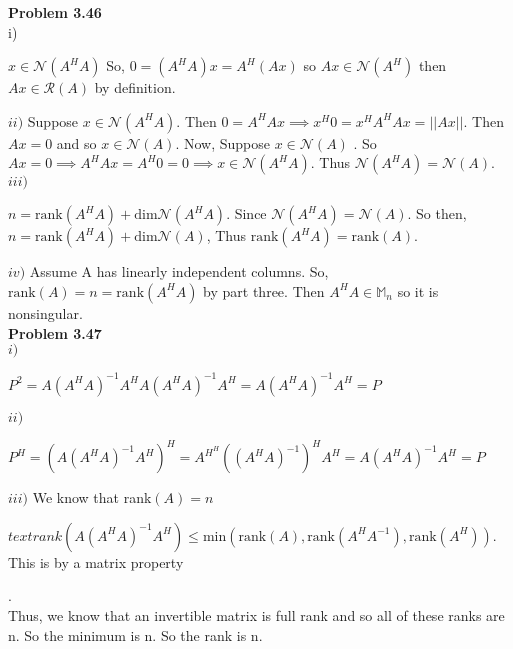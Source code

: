 \documentclass[letterpaper,12pt]{article}
\theoremstyle{definition}
\begin{document}
\vspace{5mm}
 \noindent\textbf{Problem 3.46}\\
 i) \begin{center} $x \in \mathcal{N}(A^HA)$ So, $0 = (A^HA)x = A^H(Ax)$ so  $Ax \in \mathcal{N}(A^H)$ then $Ax \in \mathcal{R}(A)$ by definition.  \end{center}
 $ii)$  Suppose $x \in \mathcal{N}(A^HA)$.  Then $0 = A^HAx \implies x^H0 = x^HA^HAx = ||Ax||$.  Then $Ax= 0$ and so $x \in \mathcal{N}(A)$.  Now, Suppose $x \in \mathcal{N}(A)$ .  So $Ax = 0 \implies A^HAx = A^H0 = 0 \implies x \in \mathcal{N}(A^HA)$.  Thus $\mathcal{N}(A^HA) = \mathcal{N}(A).$\\
 $iii)$ \begin{center} $n = \text{rank}(A^HA) + \text{dim}\mathcal{N}(A^HA)$.  Since $\mathcal{N}(A^HA) = \mathcal{N}(A)$.  So then, $n = \text{rank}(A^HA) + \text{dim}\mathcal{N}(A)$, Thus $\text{rank}(A^HA) = \text{rank}(A)$. \end{center} 
 $iv)$ Assume A has linearly independent columns.  So, $\text{rank}(A) = n = \text{rank}(A^HA)$ by part three.  Then $A^HA \in \mathbb{M}_n$ so it is nonsingular.\\
 
 
 \vspace{5mm}
 \noindent\textbf{Problem 3.47}\\
 $i)$ \begin{center} $P^2 = A(A^HA)^{-1}A^HA(A^HA)^{-1}A^H = A(A^HA)^{-1}A^H = P$ \end{center}
 $ii)$ \begin{center} $P^H = (A(A^HA)^{-1}A^H)^H = A^{H^H}((A^HA)^{-1})^HA^H = A(A^HA)^{-1}A^H = P$ \end{center}
 $iii)$ We know that rank$(A) = n$\begin{center} $text{rank}(A(A^HA)^{-1}A^H) \leq \text{min}(\text{rank}(A), \text{rank}(A^HA^{-1}), \text{rank}(A^H))$. This is by a matrix property \end{center}. \\
 Thus, we know that an invertible matrix is full rank and so all of these ranks are n.  So the minimum is n.  So the rank is n.\\
 
 
 
\end{document}
